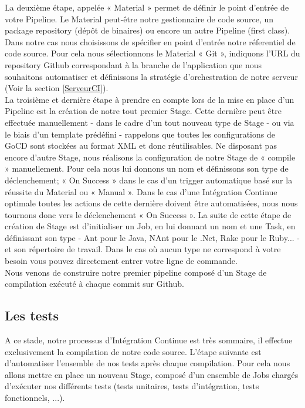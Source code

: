       La deuxième étape, appelée « Material » permet de définir le point d'entrée de votre Pipeline. Le Material peut-être notre gestionnaire de code source, un package repository (dépôt de binaires) ou encore un autre Pipeline (first class). Dans notre cas nous choisissons de spécifier en point d'entrée notre réferentiel de code source. Pour cela nous sélectionnons le Material « Git », indiquons l'URL du repository Github correspondant à la branche de l'application que nous souhaitons automatiser et définissons la stratégie d'orchestration de notre serveur (Voir la section \ref{ServeurCI}).\\

      La troisième et dernière étape à prendre en compte lors de la mise en place d'un Pipeline est la création de notre tout premier Stage. Cette dernière peut être effectuée manuellement - dans le cadre d'un tout nouveau type de Stage - ou via le biais d'un template prédéfini - rappelons que toutes les configurations de GoCD sont stockées au format XML et donc réutilisables. Ne disposant pas encore d'autre Stage, nous réalisons la configuration de notre Stage de « compile » manuellement. Pour cela nous lui donnons un nom et définissons son type de déclenchement; « On Success » dans le cas d'un trigger automatique basé sur la réussite du Material ou « Manual ». Dans le cas d'une Intégration Continue optimale toutes les actions de cette dernière doivent être automatisées, nous nous tournons donc vers le déclenchement « On Success ». La suite de cette étape de création de Stage est d'initialiser un Job, en lui donnant un nom et une Task, en définissant son type - Ant pour le Java, NAnt pour le .Net, Rake pour le Ruby... - et son répertoire de travail. Dans le cas où aucun type ne correspond à votre besoin vous pouvez directement entrer votre ligne de commande.\\

      Nous venons de construire notre premier pipeline composé d'un Stage de compilation exécuté à chaque commit sur Github.

      \subsection{Les tests}
      A ce stade, notre processus d'Intégration Continue est très sommaire, il effectue exclusivement la compilation de notre code source. L'étape suivante est d'automatiser l'ensemble de nos tests après chaque compilation. Pour cela nous allons mettre en place un nouveau Stage, composé d'un ensemble de Jobs chargés d'exécuter nos différents tests (tests unitaires, tests d'intégration, tests fonctionnels, ...).\\


